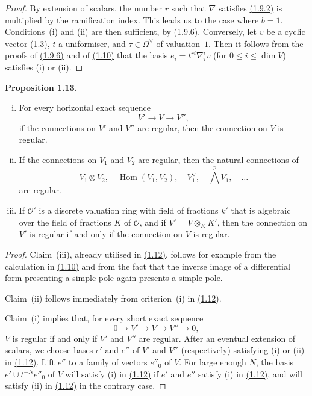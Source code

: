 \documentclass{report}
\newenvironment{itenv}[1]
  {\phantomsection\par\medskip\noindent\textbf{#1.}\itshape}
  {\par\medskip}
\renewcommand{\cal}[1]{{\mathcal{#1}}}
\renewcommand{\leq}{\leqslant}
\DeclareMathOperator{\Hom}{Hom}
\newcommand{\oldpage}[1]{\marginpar{\footnotesize$\Big\vert$ \textit{p.~#1}}}
\begin{document}
\begin{proof}
  By extension of scalars, the number $r$ such that $\nabla$ satisfies \hyperref[II.1.9.2]{(1.9.2)} is multiplied by the ramification index.
  This leads us to the case where $b=1$.
  Conditions~(i) and (ii) are then sufficient, by \hyperref[II.1.9.6]{(1.9.6)}.
  Conversely, let $v$ be a cyclic vector \hyperref[II.1.3]{(1.3)}, $t$ a uniformiser, and $\tau\in\Omega^\vee$ of valuation~$1$.
  Then it follows from the proofs of \hyperref[II.1.9.6]{(1.9.6)} and of \hyperref[II.1.10]{(1.10)} that the basis $e_i=t^{ri}\nabla_\tau^i v$ (for $0\leq i\leq\dim V$) satisfies (i) or (ii).
\end{proof}

\begin{itenv}{Proposition 1.13}
\label{II.1.13}
  \begin{enumerate}[(i)]
    \item For every horizontal exact sequence
      \[
        V' \to V \to V'',
      \]
      if the connections on $V'$ and $V''$ are regular, then the connection on $V$ is regular.
    \item If the connections on $V_1$ and $V_2$ are regular, then the natural connections of
      \[
        V_1\otimes V_2,
        \quad \Hom(V_1,V_2),
        \quad V_1^\vee,
        \quad \bigwedge^p V_1,
        \quad \ldots
      \]
      are regular.
    \item If $\cal{O}'$ is a discrete valuation ring with field of fractions $k'$ that is algebraic over the field of fractions $K$ of $\cal{O}$, and if $V'=V\otimes_K K'$, then the connection on $V'$ is regular if and only if the connection on $V$ is regular.
  \end{enumerate}
\end{itenv}

\begin{proof}
  Claim~(iii), already utilised in \hyperref[II.1.12]{(1.12)}, follows for example from the calculation in \hyperref[II.1.10]{(1.10)} and from the fact that the inverse image of a differential form presenting a simple pole again presents a simple pole.

\oldpage{52}
  Claim~(ii) follows immediately from criterion~(i) in \hyperref[II.1.12]{(1.12)}.

  Claim~(i) implies that, for every short exact sequence
  \[
    0 \to V' \to V \to V'' \to 0,
  \]
  $V$ is regular if and only if $V'$ and $V''$ are regular.
  After an eventual extension of scalars, we choose bases $e'$ and $e''$ of $V'$ and $V''$ (respectively) satisfying (i) or (ii) in \hyperref[II.1.12]{(1.12)}.
  Lift $e''$ to a family of vectors $e''_0$ of $V$.
  For large enough $N$, the basis $e'\cup t^{-N}e''_0$ of $V$ will satisfy (i) in \hyperref[II.1.12]{(1.12)} if $e'$ and $e''$ satisfy (i) in \hyperref[II.1.12]{(1.12)}, and will satisfy (ii) in \hyperref[II.1.12]{(1.12)} in the contrary case.
\end{proof}
\end{document}
